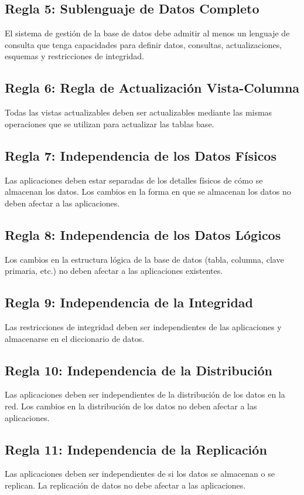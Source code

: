\documentclass{article}
\begin{document}
	\subsection*{Regla 5: Sublenguaje de Datos Completo}
	El sistema de gestión de la base de datos debe admitir al menos un lenguaje de consulta que tenga capacidades para definir datos, consultas, actualizaciones, esquemas y restricciones de integridad.
	
	\subsection*{Regla 6: Regla de Actualización Vista-Columna}
	Todas las vistas actualizables deben ser actualizables mediante las mismas operaciones que se utilizan para actualizar las tablas base.
	
	\subsection*{Regla 7: Independencia de los Datos Físicos}
	Las aplicaciones deben estar separadas de los detalles físicos de cómo se almacenan los datos. Los cambios en la forma en que se almacenan los datos no deben afectar a las aplicaciones.
	
	\subsection*{Regla 8: Independencia de los Datos Lógicos}
	Los cambios en la estructura lógica de la base de datos (tabla, columna, clave primaria, etc.) no deben afectar a las aplicaciones existentes.
	
	\subsection*{Regla 9: Independencia de la Integridad}
	Las restricciones de integridad deben ser independientes de las aplicaciones y almacenarse en el diccionario de datos.
	
	\subsection*{Regla 10: Independencia de la Distribución}
	Las aplicaciones deben ser independientes de la distribución de los datos en la red. Los cambios en la distribución de los datos no deben afectar a las aplicaciones.
	
	\subsection*{Regla 11: Independencia de la Replicación}
	Las aplicaciones deben ser independientes de si los datos se almacenan o se replican. La replicación de datos no debe afectar a las aplicaciones.
	
\end{document}
